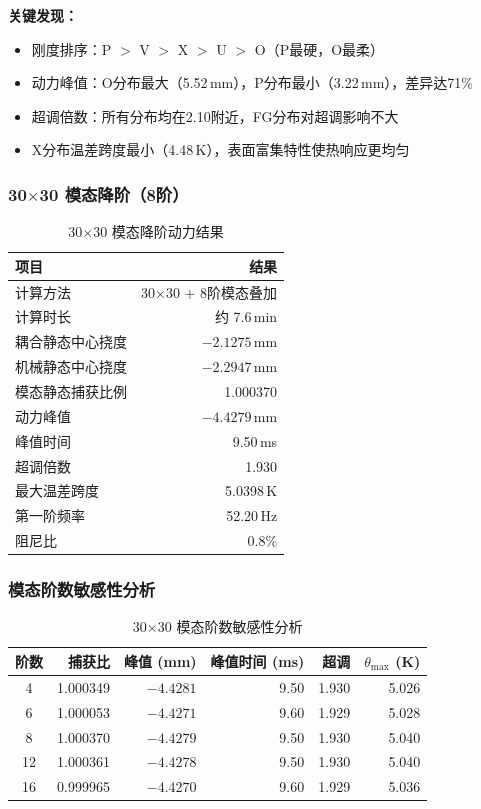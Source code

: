 \documentclass[12pt,a4paper]{ctexart}
\begin{document}
\noindent\textbf{关键发现：}
\begin{itemize}[leftmargin=2em]
\item 刚度排序：P $>$ V $>$ X $>$ U $>$ O（P最硬，O最柔）
\item 动力峰值：O分布最大（5.52\,mm），P分布最小（3.22\,mm），差异达71\%
\item 超调倍数：所有分布均在2.10附近，FG分布对超调影响不大
\item X分布温差跨度最小（4.48\,K），表面富集特性使热响应更均匀
\end{itemize}

\subsubsection{30$\times$30 模态降阶（8阶）}

\begin{table}[H]
\centering
\caption{30$\times$30 模态降阶动力结果}
\label{tab:dynamic-30x30}
\begin{tabular}{lr}
\toprule
\textbf{项目} & \textbf{结果} \\
\midrule
计算方法 & 30$\times$30 + 8阶模态叠加 \\
计算时长 & 约 7.6\,min \\
耦合静态中心挠度 & $-2.1275$\,mm \\
机械静态中心挠度 & $-2.2947$\,mm \\
模态静态捕获比例 & 1.000370 \\
动力峰值 & $-4.4279$\,mm \\
峰值时间 & 9.50\,ms \\
超调倍数 & 1.930 \\
最大温差跨度 & 5.0398\,K \\
第一阶频率 & 52.20\,Hz \\
阻尼比 & 0.8\% \\
\bottomrule
\end{tabular}
\end{table}

\subsubsection{模态阶数敏感性分析}

\begin{table}[H]
\centering
\caption{30$\times$30 模态阶数敏感性分析}
\label{tab:modal-sensitivity}
\begin{tabular}{crrrrr}
\toprule
\textbf{阶数} & \textbf{捕获比} & \textbf{峰值 (mm)} & \textbf{峰值时间 (ms)} & \textbf{超调} & $\theta_{\max}$ \textbf{(K)} \\
\midrule
4  & 1.000349 & $-4.4281$ & 9.50 & 1.930 & 5.026 \\
6  & 1.000053 & $-4.4271$ & 9.60 & 1.929 & 5.028 \\
8  & 1.000370 & $-4.4279$ & 9.50 & 1.930 & 5.040 \\
12 & 1.000361 & $-4.4278$ & 9.50 & 1.930 & 5.040 \\
16 & 0.999965 & $-4.4270$ & 9.60 & 1.929 & 5.036 \\
\bottomrule
\end{tabular}
\end{table}
\end{document}
